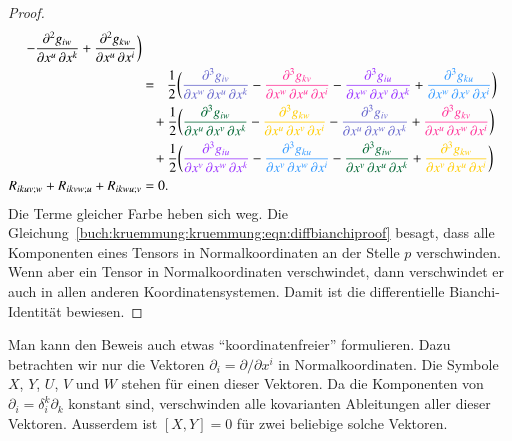 \begin{proof}
\begin{align}
-
\frac{\partial^2 g_{iw}}{\partial x^u\,\partial x^k}
+
\frac{\partial^2 g_{kw}}{\partial x^u\,\partial x^i}
\biggr)
\notag
\\
&=\phantom{+}
\frac12
\biggl(
{\color{farbeeins}
\frac{\partial^3 g_{iv}}{\partial x^w\,\partial x^u\,\partial x^k}
}
-
{\color{farbezwei}
\frac{\partial^3 g_{kv}}{\partial x^w\,\partial x^u\,\partial x^i}
}
-
{\color{farbedrei}
\frac{\partial^3 g_{iu}}{\partial x^w\,\partial x^v\,\partial x^k}
}
+
{\color{farbevier}
\frac{\partial^3 g_{ku}}{\partial x^w\,\partial x^v\,\partial x^i}
}
\biggr)
\notag
\\
&\phantom{=}\,+
\frac12
\biggl(
{\color{farbefuenf}
\frac{\partial^3 g_{iw}}{\partial x^u\,\partial x^v\,\partial x^k}
}
-
{\color{farbesechs}
\frac{\partial^3 g_{kw}}{\partial x^u\,\partial x^v\,\partial x^i}
}
-
{\color{farbeeins}
\frac{\partial^3 g_{iv}}{\partial x^u\,\partial x^w\,\partial x^k}
}
+
{\color{farbezwei}
\frac{\partial^3 g_{kv}}{\partial x^u\,\partial x^w\,\partial x^i}
}
\biggr)
\notag
\\
&\phantom{=}\,+
\frac12
\biggl(
{\color{farbedrei}
\frac{\partial^3 g_{iu}}{\partial x^v\,\partial x^w\,\partial x^k}
}
-
{\color{farbevier}
\frac{\partial^3 g_{ku}}{\partial x^v\,\partial x^w\,\partial x^i}
}
-
{\color{farbefuenf}
\frac{\partial^3 g_{iw}}{\partial x^v\,\partial x^u\,\partial x^k}
}
+
{\color{farbesechs}
\frac{\partial^3 g_{kw}}{\partial x^v\,\partial x^u\,\partial x^i}
}
\biggr)
\notag
\\
R_{ikuv;w}
+
R_{ikvw;u}
+
R_{ikwu;v}
&=0.
\label{buch:kruemmung:kruemmung:eqn:diffbianchiproof}
\end{align}
\egroup
Die Terme gleicher Farbe heben sich weg.
Die Gleichung~\eqref{buch:kruemmung:kruemmung:eqn:diffbianchiproof}
besagt, dass alle Komponenten eines Tensors in Normalkoordinaten
an der Stelle $p$ verschwinden.
Wenn aber ein Tensor in Normalkoordinaten verschwindet, dann 
verschwindet er auch in allen anderen Koordinatensystemen.
Damit ist die differentielle Bianchi-Identität bewiesen.
\end{proof}

Man kann den Beweis auch etwas ``koordinatenfreier'' formulieren.
Dazu betrachten wir nur die Vektoren $\partial_i=\partial/\partial x^i$ in
Normalkoordinaten.
Die Symbole $X$, $Y$, $U$, $V$ und $W$ stehen für einen dieser
Vektoren.
Da die Komponenten von $\partial_i = \delta_{i}^k \partial_k$ konstant
sind, verschwinden alle kovarianten Ableitungen aller dieser Vektoren.
Ausserdem ist $[X,Y]=0$ für zwei beliebige solche Vektoren.

